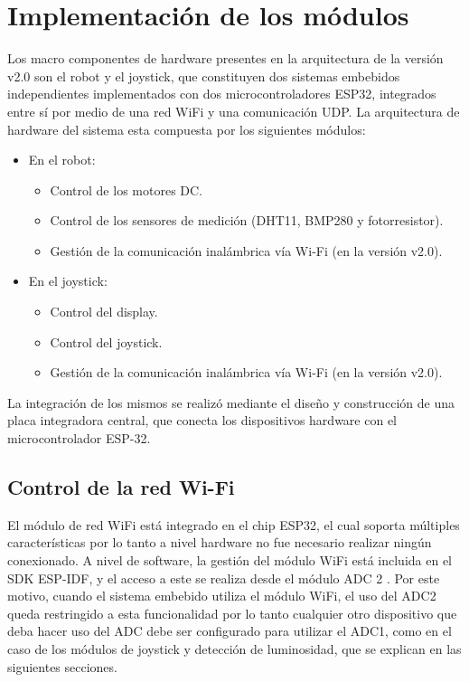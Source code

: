 \section{Implementación de los módulos}

Los macro componentes de hardware presentes en la arquitectura de la versión v2.0 son el robot y el joystick, que constituyen dos sistemas embebidos independientes implementados con dos microcontroladores ESP32, integrados entre sí por medio de una red WiFi y una comunicación UDP. La arquitectura de hardware del sistema esta compuesta por los siguientes módulos:


\begin{itemize}
	\item En el robot:
	\begin{itemize}
		\item Control de los motores DC.	
		\item Control de los sensores de medición (DHT11, BMP280 y fotorresistor).
		\item Gestión de la  comunicación inalámbrica vía Wi-Fi (en la versión v2.0).
	\end{itemize}
	\item En el joystick:
	\begin{itemize}
		\item Control del display.
		\item Control del joystick.
		\item Gestión de la  comunicación inalámbrica vía Wi-Fi (en la versión v2.0).
	\end{itemize}
\end{itemize}

La integración de los mismos se realizó mediante el diseño y construcción de una placa integradora central, que conecta los dispositivos hardware con el microcontrolador ESP-32.


\subsection{Control de la red Wi-Fi}

El módulo de red WiFi está integrado en el chip ESP32, el cual soporta múltiples características \cite{ESP32_WiFi} por lo tanto a nivel hardware no fue necesario realizar ningún conexionado.
A nivel de software, la gestión del módulo WiFi está incluida en el SDK ESP-IDF, y el acceso a este se realiza desde el módulo ADC 2 \cite{ESP32_adc}. Por este motivo, cuando el sistema embebido utiliza el módulo WiFi, el uso del ADC2 queda restringido a esta funcionalidad por lo tanto cualquier otro dispositivo que deba hacer uso del ADC debe ser configurado para utilizar el ADC1, como en el caso de los módulos de joystick y detección de luminosidad, que se explican en las siguientes secciones.

